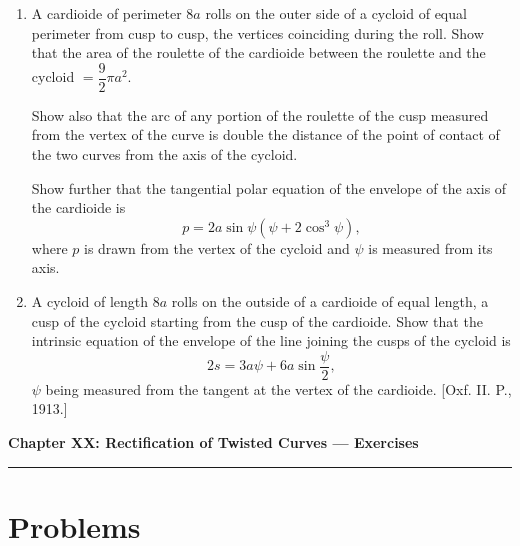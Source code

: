 \documentclass[11pt, a4paper]{article}
\newcommand{\source}[1]{\hfill\textnormal{[#1]}}
\begin{document}
\begin{enumerate}[leftmargin=2em]
\item A cardioide of perimeter $8a$ rolls on the outer side of a cycloid of equal perimeter from cusp to cusp, the vertices coinciding during the roll. Show that the area of the roulette of the cardioide between the roulette and the cycloid $=\dfrac92\pi a^2$.

Show also that the arc of any portion of the roulette of the cusp measured from the vertex of the curve is double the distance of the point of contact of the two curves from the axis of the cycloid.

Show further that the tangential polar equation of the envelope of the axis of the cardioide is
\[
p=2a\sin\psi(\psi+2\cos^3\psi),
\]
where $p$ is drawn from the vertex of the cycloid and $\psi$ is measured from its axis.

\item A cycloid of length $8a$ rolls on the outside of a cardioide of equal length, a cusp of the cycloid starting from the cusp of the cardioide. Show that the intrinsic equation of the envelope of the line joining the cusps of the cycloid is
\[
2s=3a\psi+6a\sin\frac{\psi}{2},
\]
$\psi$ being measured from the tangent at the vertex of the cardioide. \source{Oxf. II. P., 1913.}

\end{enumerate}

\newpage

\begin{center}
    {\LARGE \bfseries \color{accent} Chapter XX: Rectification of Twisted Curves --- Exercises}\\
    \vspace{0.2cm}
    {\color{accent}\rule{0.55\linewidth}{0.8pt}}
\end{center}
\vspace{0.35cm}

\section*{Problems}
\end{document}
